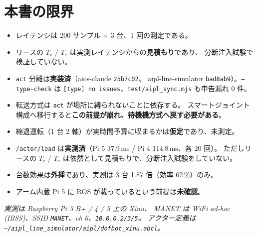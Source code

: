 \documentclass[11pt,a4paper]{article}
\newcommand{\code}[1]{\texttt{#1}}
\newcommand{\prob}[1]{\textbf{\textcolor{red!55!black}{#1}}}
\newcommand{\good}[1]{\textbf{\textcolor{green!45!black}{#1}}}
\begin{document}
\section{本書の限界}

\begin{itemize}[leftmargin=1.6em,itemsep=2pt]
\item レイテンシは 200 サンプル $\times$ 3 台、1 回の測定である。
\item リースの $T_r$ / $T_e$ は実測レイテンシからの\textbf{見積もり}であり、
      分断注入試験で検証していない。
\item \code{act} 分離は\good{実装済}（aios-claude \code{25b7c02}、
      aipl-line-simulator \code{bad8ab9}）。\code{--type-check} は
      \code{[type] no issues}、\code{test/aipl\_sync.mjs} も申告漏れ 0 件。
\item 転送方式は \code{act} が場所に縛られないことに依存する。
      スマートジョイント構成へ移行すると\prob{この前提が崩れ、待機機方式へ戻す必要がある}。
\item 縮退運転（1 台 2 軸）が実時間予算に収まるかは\textbf{仮定}であり、未測定。
\item \code{/actor/load} は\good{実測済}（Pi 5 37.9\,ms / Pi 4 114.8\,ms、各 20 回）。
      ただしリースの $T_r$ / $T_e$ は依然として見積もりで、分断注入試験をしていない。
\item 台数効果は\textbf{外挿}であり、実測は 3 台 1.87 倍（効率 62\,\%）のみ。
\item アーム内蔵 Pi 5 に ROS が載っているという前提は\textbf{未確認}。
\end{itemize}

\vfill
{\small\itshape 実測は Raspberry Pi 3 B+ / 4 / 5 上の Xinu、
MANET は WiFi ad-hoc (IBSS)、SSID \code{MANET}、ch 6、\code{10.0.0.2/3/5}。
アクター定義は \code{\textasciitilde/aipl\_line\_simulator/aipl/dofbot\_xinu.abcl}。}
\end{document}
